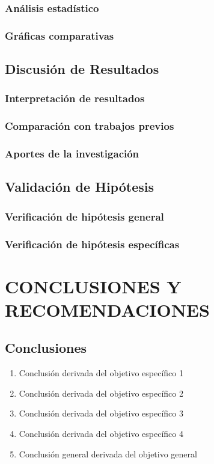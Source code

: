 \documentclass[12pt, letterpaper, oneside]{book}
\begin{document}
\subsection{Análisis estadístico}
\subsection{Gráficas comparativas}

\section{Discusión de Resultados}
\subsection{Interpretación de resultados}
\subsection{Comparación con trabajos previos}
\subsection{Aportes de la investigación}

\section{Validación de Hipótesis}
\subsection{Verificación de hipótesis general}
\subsection{Verificación de hipótesis específicas}

\chapter{CONCLUSIONES Y RECOMENDACIONES}

\section{Conclusiones}
\begin{enumerate}
    \item Conclusión derivada del objetivo específico 1
    \item Conclusión derivada del objetivo específico 2
    \item Conclusión derivada del objetivo específico 3
    \item Conclusión derivada del objetivo específico 4
    \item Conclusión general derivada del objetivo general
\end{enumerate}
\end{document}

